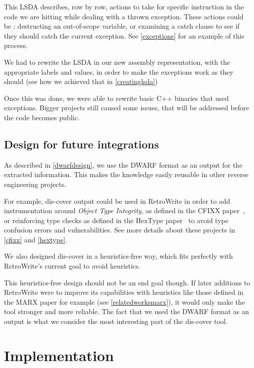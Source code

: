 \documentclass[a4paper,11pt,oneside]{report}
\begin{document}
This LSDA describes, row by row, actions to take for specific instruction in
the code we are hitting while dealing with a thrown exception. These actions
could be : destructing an out-of-scope variable, or examining a catch clause
to see if they should catch the current exception. See \autoref{exceptions}
for an example of this process.

We had to rewrite the LSDA in our new assembly representation, with the
appropriate labels and values, in order to make the exceptions work as they
should (see how we achieved that in \autoref{creatinglsda})

Once this was done, we were able to rewrite basic C++ binaries that used
exceptions.
Bigger projects still caused some issues, that will be addressed
before the code becomes public.


\section{Design for future integrations}

As described in \autoref{dwarfdesign}, we use the DWARF format as an output
for the extracted information. This makes the knowledge easily reusable in
other reverse engineering projects.

For example, dis-cover output could be used in RetroWrite in order to add
instrumentation around \emph{Object Type Integrity}, as defined in the CFIXX
paper~\cite{cfixx}, or reinforcing type checks as defined in the HexType
paper~\cite{hextype} to avoid type confusion errors and vulnerabilities.
See more details about these projects in \autoref{cfixx} and
\autoref{hextype}.

We also designed dis-cover in a heuristics-free way, which fits perfectly with
RetroWrite's current goal to avoid heuristics.

This heuristics-free design should not be an end goal though.
If later additions to RetroWrite were to improve its capabilities with
heuristics like those defined in the MARX paper for example (see
\autoref{relatedworksmarx}), it would only make the tool stronger and more
reliable.
The fact that we used the DWARF format as an output is what we consider the
most interesting part of the dis-cover tool.


\chapter{Implementation}
\end{document}
